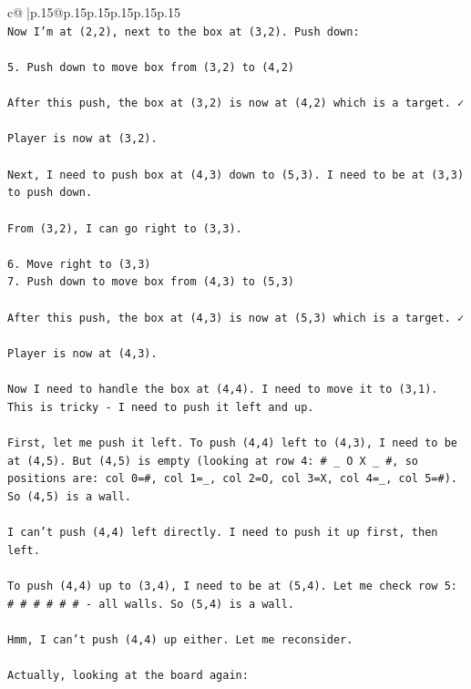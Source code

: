 \documentclass{article}
\begin{document}
{\begin{supertabular}{c@{$\;$}|p{.15\linewidth}@{}p{.15\linewidth}p{.15\linewidth}p{.15\linewidth}p{.15\linewidth}p{.15\linewidth}}
{{{\\ 
\texttt{Now I'm at (2,2), next to the box at (3,2). Push down:} \\
\\ 
\texttt{5. Push down to move box from (3,2) to (4,2)} \\
\\ 
\texttt{After this push, the box at (3,2) is now at (4,2) which is a target. ✓} \\
\\ 
\texttt{Player is now at (3,2).} \\
\\ 
\texttt{Next, I need to push box at (4,3) down to (5,3). I need to be at (3,3) to push down.} \\
\\ 
\texttt{From (3,2), I can go right to (3,3).} \\
\\ 
\texttt{6. Move right to (3,3)} \\
\texttt{7. Push down to move box from (4,3) to (5,3)} \\
\\ 
\texttt{After this push, the box at (4,3) is now at (5,3) which is a target. ✓} \\
\\ 
\texttt{Player is now at (4,3).} \\
\\ 
\texttt{Now I need to handle the box at (4,4). I need to move it to (3,1). This is tricky {-} I need to push it left and up.} \\
\\ 
\texttt{First, let me push it left. To push (4,4) left to (4,3), I need to be at (4,5). But (4,5) is empty (looking at row 4: \# \_ O X \_ \#, so positions are: col 0=\#, col 1=\_, col 2=O, col 3=X, col 4=\_, col 5=\#). So (4,5) is a wall.} \\
\\ 
\texttt{I can't push (4,4) left directly. I need to push it up first, then left.} \\
\\ 
\texttt{To push (4,4) up to (3,4), I need to be at (5,4). Let me check row 5: \# \# \# \# \# \# {-} all walls. So (5,4) is a wall.} \\
\\ 
\texttt{Hmm, I can't push (4,4) up either. Let me reconsider.} \\
\\ 
\texttt{Actually, looking at the board again:} \\
}}}
\end{supertabular}}
\end{document}
